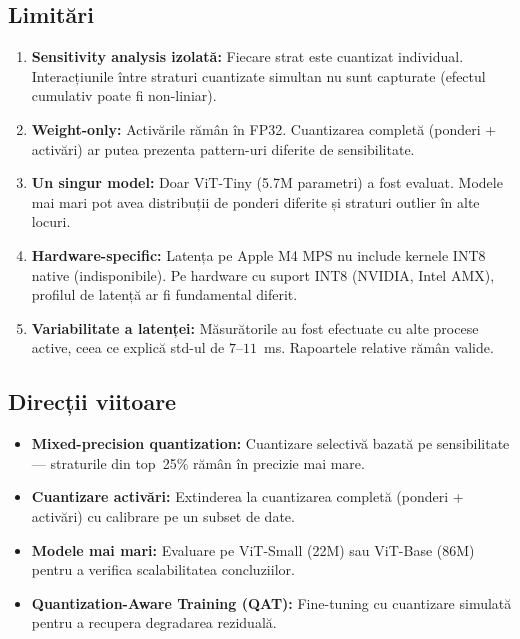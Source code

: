 \documentclass[12pt,a4paper]{article}
\begin{document}
\subsection{Limitări}

\begin{enumerate}
  \item \textbf{Sensitivity analysis izolată:} Fiecare strat este cuantizat
    individual. Interacțiunile între straturi cuantizate simultan nu sunt
    capturate (efectul cumulativ poate fi non-liniar).

  \item \textbf{Weight-only:} Activările rămân în FP32. Cuantizarea
    completă (ponderi + activări) ar putea prezenta pattern-uri diferite
    de sensibilitate.

  \item \textbf{Un singur model:} Doar ViT-Tiny (5.7M parametri) a fost
    evaluat. Modele mai mari pot avea distribuții de ponderi diferite și
    straturi outlier în alte locuri.

  \item \textbf{Hardware-specific:} Latența pe Apple M4 MPS nu include
    kernele INT8 native (indisponibile). Pe hardware cu suport INT8
    (NVIDIA, Intel AMX), profilul de latență ar fi fundamental diferit.

  \item \textbf{Variabilitate a latenței:} Măsurătorile au fost efectuate
    cu alte procese active, ceea ce explică std-ul de $7\text{--}11$~ms.
    Rapoartele relative rămân valide.
\end{enumerate}

\subsection{Direcții viitoare}

\begin{itemize}
  \item \textbf{Mixed-precision quantization:} Cuantizare selectivă
    bazată pe sensibilitate --- straturile din top~25\% rămân în precizie
    mai mare.
  \item \textbf{Cuantizare activări:} Extinderea la cuantizarea completă
    (ponderi + activări) cu calibrare pe un subset de date.
  \item \textbf{Modele mai mari:} Evaluare pe ViT-Small (22M) sau
    ViT-Base (86M) pentru a verifica scalabilitatea concluziilor.
  \item \textbf{Quantization-Aware Training (QAT):} Fine-tuning cu
    cuantizare simulată pentru a recupera degradarea reziduală.
\end{itemize}
\end{document}
